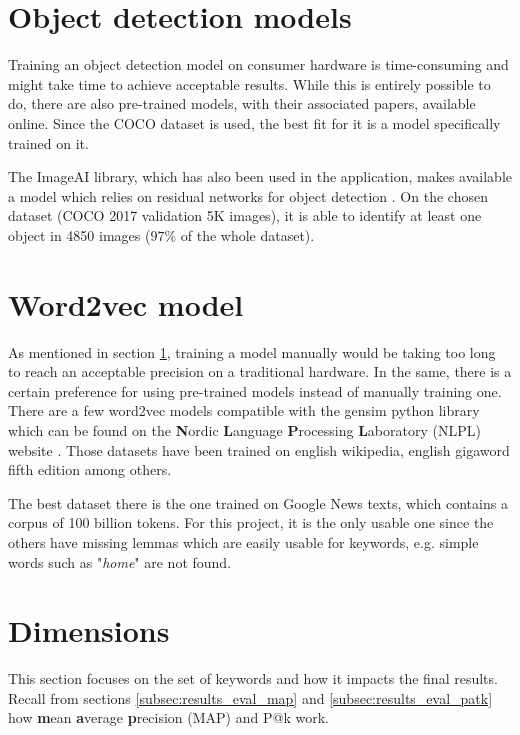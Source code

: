 \section{Object detection models}
\label{sec:results_obj}

Training an object detection model on consumer hardware is time-consuming and might take time to achieve acceptable results. While this is entirely possible to do, there are also pre-trained models, with their associated papers, available online. Since the COCO dataset is used, the best fit for it is a model specifically trained on it.

The ImageAI library, which has also been used in the application, makes available a model which relies on residual networks for object detection \cite{image-ai}. On the chosen dataset (COCO 2017 validation 5K images), it is able to identify at least one object in 4850 images ($97\%$ of the whole dataset).

\section{Word2vec model}
\label{sec:results_word2vec}

As mentioned in section \ref{sec:results_obj}, training a model manually would be taking too long to reach an acceptable precision on a traditional hardware. In the same, there is a certain preference for using pre-trained models instead of manually training one. There are a few word2vec models compatible with the gensim python library which can be found on the \textbf{N}ordic \textbf{L}anguage \textbf{P}rocessing \textbf{L}aboratory (NLPL) website \cite{word2vec-datasets}. Those datasets have been trained on english wikipedia, english gigaword fifth edition among others.

The best dataset there is the one trained on Google News texts, which contains a corpus of 100 billion tokens. For this project, it is the only usable one since the others have missing lemmas which are easily usable for keywords, e.g. simple words such as "\textit{home}" are not found.

\section{Dimensions}
\label{sec:results_dimensions}

This section focuses on the set of keywords and how it impacts the final results. Recall from sections \ref{subsec:results_eval_map} and \ref{subsec:results_eval_patk} how \textbf{m}ean \textbf{a}verage \textbf{p}recision (MAP) and P@k work. 


